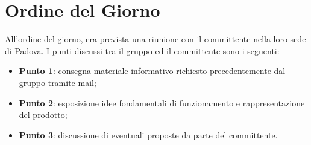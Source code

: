 \section{Ordine del Giorno}
All'ordine del giorno, era prevista una riunione  con il committente nella loro sede di Padova. 
I punti discussi tra il gruppo ed il committente sono i seguenti: 
\begin{itemize}
	\item \textbf{Punto 1}: consegna materiale informativo richiesto precedentemente dal gruppo tramite mail; 
	\item \textbf{Punto 2}: esposizione idee fondamentali di funzionamento e rappresentazione del prodotto; 
	\item \textbf{Punto 3}: discussione di eventuali proposte da parte del committente.
\end{itemize}